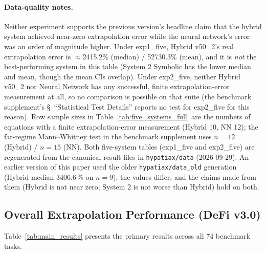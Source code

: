 \documentclass[twoside,11pt]{article}
\begin{document}
\paragraph{Data-quality notes.} Neither experiment supports the previous
version's headline claim that the hybrid system achieved near-zero
extrapolation error while the neural network's error was an order of
magnitude higher. Under exp1\_five, Hybrid v50\_2's real extrapolation
error is $\approx$2415.2\% (median) / 52730.3\% (mean), and it is
\emph{not} the best-performing system in this table (System 2 Symbolic has
the lower median and mean, though the mean CIs overlap). Under exp2\_five, neither Hybrid v50\_2 nor Neural
Network has any successful, finite extrapolation-error measurement at
all, so no comparison is possible on that suite (the benchmark
supplement's \S~``Statistical Test Details''
reports no test for exp2\_five for this reason). Row sample sizes in Table~\ref{tab:five_systems_full} are the numbers of equations
with a finite extrapolation-error measurement (Hybrid 10, NN 12); the
far-regime Mann--Whitney test in the benchmark supplement uses $n=12$ (Hybrid) /
$n=15$ (NN). Both five-system tables (exp1\_five and exp2\_five) are regenerated
from the canonical result files in \texttt{hypatiax/data} (2026-09-29). An earlier
version of this paper used the older \texttt{hypatiax/data\_old} generation
(Hybrid median 3406.6\,\% on $n=9$); the values differ, and the claims made from them
(Hybrid is not near zero; System 2 is not worse than Hybrid) hold on both.

\subsection{Overall Extrapolation Performance (DeFi v3.0)}\label{subsec:overall-extrapolation-performance-defi-v}
\label{sec:results_defi}

Table~\ref{tab:main_results} presents the primary results across all 74 benchmark tasks.
\end{document}
